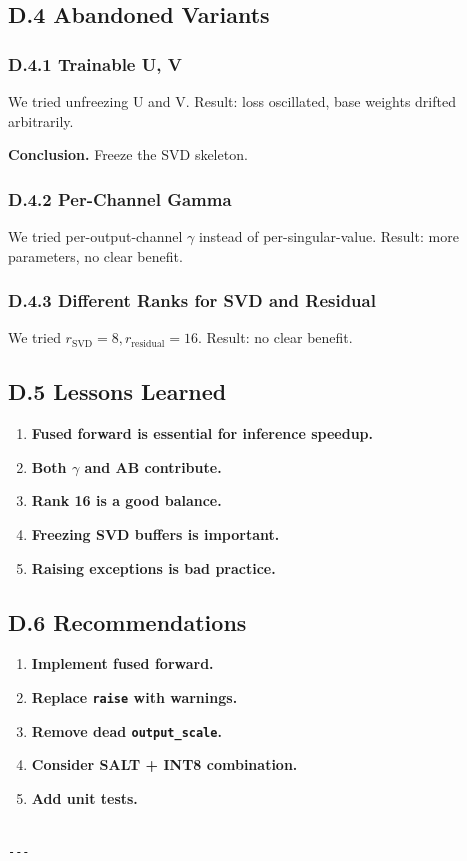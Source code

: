 \subsection{D.4 Abandoned Variants}

\subsubsection{D.4.1 Trainable U, V}

We tried unfreezing U and V. Result: loss oscillated, base weights drifted 
arbitrarily.

\textbf{Conclusion.} Freeze the SVD skeleton.

\subsubsection{D.4.2 Per-Channel Gamma}

We tried per-output-channel $\gamma$ instead of per-singular-value. Result: more 
parameters, no clear benefit.

\subsubsection{D.4.3 Different Ranks for SVD and Residual}

We tried $r_\text{SVD} = 8, r_\text{residual} = 16$. Result: no clear 
benefit.

\subsection{D.5 Lessons Learned}

\begin{enumerate}
\item \textbf{Fused forward is essential for inference speedup.}
\item \textbf{Both $\gamma$ and AB contribute.}
\item \textbf{Rank 16 is a good balance.}
\item \textbf{Freezing SVD buffers is important.}
\item \textbf{Raising exceptions is bad practice.}

\end{enumerate}
\subsection{D.6 Recommendations}

\begin{enumerate}
\item \textbf{Implement fused forward.}
\item \textbf{Replace \texttt{raise} with warnings.}
\item \textbf{Remove dead \texttt{output\_scale}.}
\item \textbf{Consider SALT + INT8 combination.}
\item \textbf{Add unit tests.}
\end{enumerate}
\begin{lstlisting}

---
\end{lstlisting}